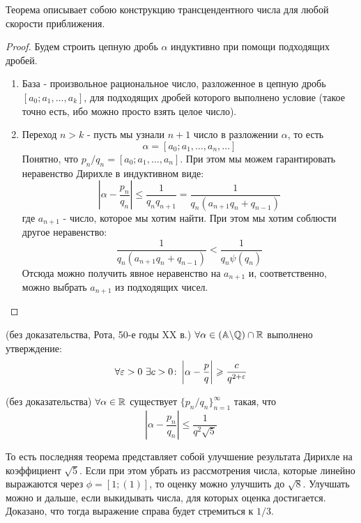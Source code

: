 \begin{note}
	Теорема описывает собою конструкцию трансцендентного числа для любой скорости приближения.
\end{note}

\begin{proof}
	Будем строить цепную дробь $\alpha$ индуктивно при помощи подходящих дробей.
	\begin{enumerate}
		\item База - произвольное рациональное число, разложенное в цепную дробь $[a_0; a_1, \ldots, a_k]$, для подходящих дробей которого выполнено условие (такое точно есть, ибо можно просто взять целое число).
		\item Переход $n > k$ - пусть мы узнали $n + 1$ число в разложении $\alpha$, то есть
		\[
			\alpha = [a_0; a_1, \ldots, a_n, \ldots]
		\]
		Понятно, что $p_n/q_n = [a_0; a_1, \ldots, a_n]$. При этом мы можем гарантировать неравенство Дирихле в индуктивном виде:
		\[
			\left|\alpha - \frac{p_n}{q_n}\right| \le \frac{1}{q_n q_{n + 1}} = \frac{1}{q_n (a_{n + 1}q_n + q_{n - 1})}
		\]
		где $a_{n + 1}$ - число, которое мы хотим найти. При этом мы хотим соблюсти другое неравенство:
		\[
			\frac{1}{q_n (a_{n + 1} q_n + q_{n - 1})} < \frac{1}{q_n \psi(q_n)}
		\]
		Отсюда можно получить явное неравенство на $a_{n + 1}$ и, соответственно, можно выбрать $a_{n + 1}$ из подходящих чисел.
	\end{enumerate}
\end{proof}

\begin{theorem} (без доказательства, Рота, 50-е годы XX в.)
	$\forall \alpha \in (\mathbb{A} \backslash \mathbb{Q}) \cap \mathbb{R}$ выполнено утверждение:
	\[
		\forall \eps > 0\ \exists c > 0 \colon \left|\alpha - \frac{p}{q}\right| \ge \frac{c}{q^{2 + \eps}}
	\]
\end{theorem}

\begin{theorem} (без доказательства)
	$\forall \alpha \in \mathbb{R}$ существует $\{p_n/q_n\}_{n = 1}^\infty$ такая, что
	\[
		\left|\alpha - \frac{p_n}{q_n}\right| \le \frac{1}{q^2 \sqrt{5}}
	\]
\end{theorem}

\begin{note}
	То есть последняя теорема представляет собой улучшение результата Дирихле на коэффициент $\sqrt{5}$. Если при этом убрать из рассмотрения числа, которые линейно выражаются через $\phi = [1; (1)]$, то оценку можно улучшить до $\sqrt{8}$. Улучшать можно и дальше, если выкидывать числа, для которых оценка достигается. Доказано, что тогда выражение справа будет стремиться к $1/3$.
\end{note}